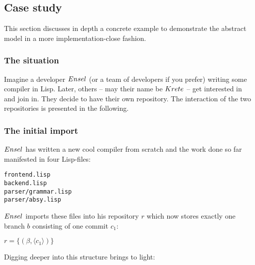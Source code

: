 \documentclass[fleqn, 10pt, a4paper]{report} \usepackage{amssymb}
\begin{document}
\subsection{Case study}

This section discusses in depth a concrete example to demonstrate the
abstract model in a more implementation-close fashion.

\subsubsection{The situation}

Imagine a developer $\mathnormal{Ensel}$ (or a team of developers if
you prefer) writing some compiler in Lisp. Later, others -- may their
name be $\mathnormal{Krete}$ -- get interested in and join in.  They
decide to have their own repository. The interaction of the two
repositories is presented in the following.

\subsubsection{The initial import}

$\mathnormal{Ensel}$ has written a new cool compiler from scratch and
the work done so far manifested in four Lisp-files:

\begin{verbatim}
frontend.lisp
backend.lisp
parser/grammar.lisp
parser/absy.lisp
\end{verbatim}

$\mathnormal{Ensel}$ imports these files into his repository $r$ which
now stores exactly one branch $b$ consisting of one commit $c_1$:

$r=\{(\beta, \langle c_1\rangle)\}$

Digging deeper into this structure brings to light:
\end{document}
